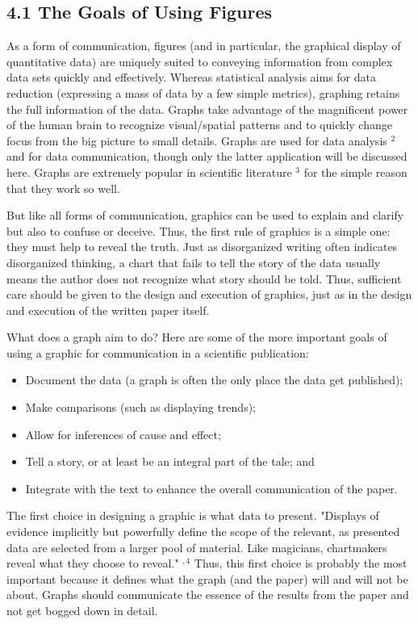 \subsection*{4.1 The Goals of Using Figures}
As a form of communication, figures (and in particular, the graphical display of quantitative data) are uniquely suited to conveying information from complex data sets quickly and effectively. Whereas statistical analysis aims for data reduction (expressing a mass of data by a few simple metrics), graphing retains the full information of the data. Graphs take advantage of the magnificent power of the human brain to recognize visual/spatial patterns and to quickly change focus from the big picture to small details. Graphs are used for data analysis ${ }^{2}$ and for data communication, though only the latter application will be discussed here. Graphs are extremely popular in scientific literature ${ }^{3}$ for the simple reason that they work so well.

But like all forms of communication, graphics can be used to explain and clarify but also to confuse or deceive. Thus, the first rule of graphics is a simple one: they must help to reveal the truth. Just as disorganized writing often indicates disorganized thinking, a chart that fails to tell the story of the data usually means the author does not recognize what story should be told. Thus, sufficient care should be given to the design and execution of graphics, just as in the design and execution of the written paper itself.

What does a graph aim to do? Here are some of the more important goals of using a graphic for communication in a scientific publication:

\begin{itemize}
  \item Document the data (a graph is often the only place the data get published);
  \item Make comparisons (such as displaying trends);
  \item Allow for inferences of cause and effect;
  \item Tell a story, or at least be an integral part of the tale; and
  \item Integrate with the text to enhance the overall communication of the paper.
\end{itemize}

The first choice in designing a graphic is what data to present. "Displays of evidence implicitly but powerfully define the scope of the relevant, as presented data are selected from a larger pool of material. Like magicians, chartmakers reveal what they choose to reveal." ${ }^{, 4}$ Thus, this first choice is probably the most important because it defines what the graph (and the paper) will and will not be about. Graphs should communicate the essence of the results from the paper and not get bogged down in detail.

